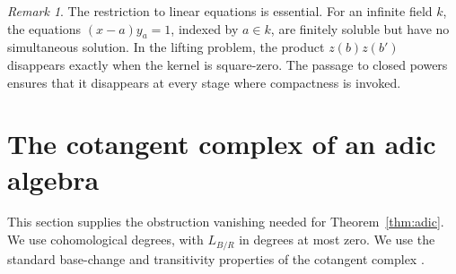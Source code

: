 \documentclass[11pt]{article}
\theoremstyle{definition}\newtheorem{definition}[theorem]{Definition}
\theoremstyle{remark}\newtheorem{remark}[theorem]{Remark}
\begin{document}
\begin{remark}
The restriction to linear equations is essential. For an infinite field $k$, the equations $(x-a)y_a=1$, indexed by $a\in k$, are finitely soluble but have no simultaneous solution. In the lifting problem, the product $z(b)z(b')$ disappears exactly when the kernel is square-zero. The passage to closed powers ensures that it disappears at every stage where compactness is invoked.
\end{remark}

\section{The cotangent complex of an adic algebra}

This section supplies the obstruction vanishing needed for Theorem~\ref{thm:adic}. We use cohomological degrees, with $L_{B/R}$ in degrees at most zero. We use the standard base-change and transitivity properties of the cotangent complex \cite[92.6--92.7]{Stacks}.
\end{document}
